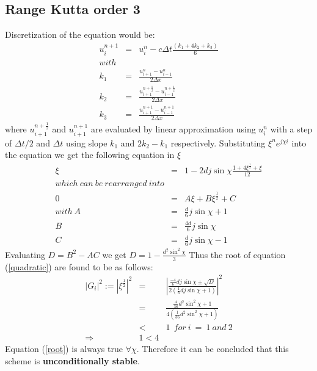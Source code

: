 \documentclass[a4paper,12pt]{report}
\begin{document}
\subsection{Range Kutta order 3}
Discretization of the equation would be:
\begin{eqnarray}
u^{n+1}_{i} &=& u^{n}_{i} - c\Delta t \frac{(k_1+4k_2+k_3)}{6}
\\with \nonumber\\
k_1 &=& \frac{u_{i+1}^{n} -u_{i-1}^{n}}{2\Delta x} \nonumber \\
k_2 &=& \frac{u_{i+1}^{n+\frac{1}{2}} -u_{i-1}^{n+\frac{1}{2}}}{2\Delta x} \nonumber\\
k_3 &=& \frac{u_{i+1}^{n+1} -u_{i-1}^{n+1}}{2\Delta x} \nonumber
\end{eqnarray}
where $u_{i+1}^{n+\frac{1}{2}}$ and $u_{i+1}^{n+1}$ are evaluated by linear approximation using $u^{n}_{i}$ with a step of $\Delta t/2$ and $\Delta t$ using slope $k_1$ and $2k_2-k_1$ respectively.
Substituting $\xi^{n}e^{j\chi i}$ into the equation we get the following equation in $\xi$
\begin{eqnarray}
\xi &=& 1-2dj\sin{\chi}\frac{1+4\xi^{\frac{1}{2}}+\xi}{12} \nonumber \\
which\ can\ be\ rearranged\ into \nonumber \\
0 &=& A\xi+B\xi^{\frac{1}{2}} + C \label{quadratic}\\
with\ A &=& \frac{d}{6}j\sin{\chi} + 1 \nonumber\\
B &=& \frac{4d}{6}j\sin{\chi} \nonumber\\
C &=& \frac{d}{6}j\sin{\chi} - 1 \nonumber
\end{eqnarray}
Evaluating $D = B^2 - AC$ we get $D = 1-\frac{d^2{\sin^2{\chi}}}{3}$
Thus the root of equation (\ref{quadratic}) are found to be as follows:
\begin{eqnarray}
|G_i|^2 := |\xi^\frac{1}{2}|^2 &=& |\frac{\frac{-4}{6}dj\sin{\chi}\pm \sqrt{D}}{2(\frac{1}{6}dj\sin{\chi}+1)}|^2 \nonumber\\
&=& \frac{\frac{4}{36}d^2\sin^2{\chi}+1}{4(\frac{1}{36}d^2\sin^2{\chi}+1)}\label{root}\\
&<& 1\ \ for\ i\ =\ 1\ and\ 2 \nonumber \\ 
\Rightarrow &1<4 \nonumber
\end{eqnarray}
Equation (\ref{root}) is always true $\forall \chi$.
Therefore it can be concluded that this scheme is \textbf{unconditionally stable}.
\end{document}
